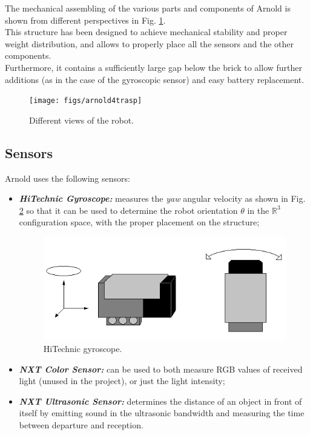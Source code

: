 \documentclass[a4paper,11pt,oneside]{book}
\begin{document}
		The mechanical assembling of the various parts and components of Arnold is shown from different perspectives in Fig. \ref{fig:arnold4trasp.png}.\\
		
		This structure has been designed to achieve mechanical stability and proper weight distribution, and allows to properly place all the sensors and the other components.\\
		Furthermore, it contains a sufficiently large gap below the brick to allow further additions (as in the case of the gyroscopic sensor) and easy battery replacement.
		
		\begin{figure}
			\centering
			\texttt{[image: figs/arnold4trasp]}
			\caption{Different views of the robot.}\label{fig:arnold4trasp.png}
		\end{figure}
		
		
		\subsection {Sensors}
		
		Arnold uses the following sensors:
		\begin{itemize}
			\item \textit{ \textbf {HiTechnic Gyroscope:}} measures the \textit{yaw} angular velocity as shown in Fig. \ref{fig:gyroscope.png} so that it can be used to determine the robot orientation $\theta$ in the $\mathbb{R}^3$ configuration space, with the proper placement on the structure;
			\begin{figure}[H]
				\centering
				\includegraphics[scale=0.6]{figs/gyroscope}
				\caption{HiTechnic gyroscope.}\label{fig:gyroscope.png}
			\end{figure}
		
			\item \textit{\textbf {NXT Color Sensor:}} can be used to both measure RGB values of received light (unused in the project), or just the light intensity;
			
			\item \textit{\textbf {NXT Ultrasonic Sensor:}} determines the distance of an object in front of itself by emitting sound in the ultrasonic bandwidth and measuring the time between departure and reception.
			
		\end{itemize}
		
\end{document}
